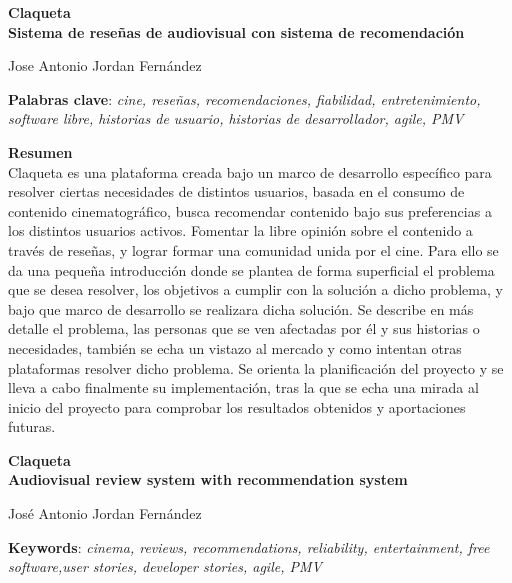 \cleardoublepage

\thispagestyle{empty}


\begin{center}
{\large\bfseries Claqueta \\ Sistema de reseñas de
audiovisual con sistema de
recomendación }\\
\end{center}
\begin{center}
Jose Antonio Jordan Fernández\\
\end{center}


\vspace{0.5cm}
\noindent\textbf{Palabras clave}: \textit{cine, reseñas, recomendaciones, fiabilidad, entretenimiento, software libre, historias de usuario, historias de desarrollador, agile, PMV}
\vspace{0.7cm}

\noindent\textbf{Resumen}\\

Claqueta es una plataforma creada bajo un marco de desarrollo específico para resolver ciertas necesidades de distintos usuarios, basada en el consumo de contenido cinematográfico, busca recomendar contenido bajo sus preferencias a los distintos usuarios activos. Fomentar la libre opinión sobre el contenido a través de reseñas, y lograr formar una comunidad unida por el cine. Para ello se da una pequeña introducción donde se plantea de forma superficial el problema que se desea resolver, los objetivos a cumplir con la solución a dicho problema, y bajo que marco de desarrollo se realizara dicha solución. Se describe en más detalle el problema, las personas que se ven afectadas por él y sus historias o necesidades, también se echa un vistazo al mercado y como intentan otras plataformas resolver dicho problema. Se orienta la planificación del proyecto y se lleva a cabo finalmente su implementación, tras la que se echa una mirada al inicio del proyecto para comprobar los resultados obtenidos y aportaciones futuras.
	

\cleardoublepage

\begin{center}
	{\large\bfseries Claqueta\\Audiovisual review system with recommendation system}\\
\end{center}
\begin{center}
	José Antonio Jordan Fernández\\
\end{center}
\vspace{0.5cm}
\noindent\textbf{Keywords}: \textit{cinema, reviews, recommendations, reliability, entertainment, free software,user stories, developer stories, agile, PMV}
\vspace{0.7cm}

